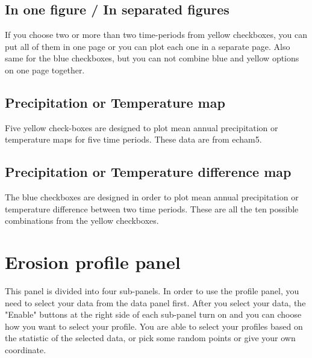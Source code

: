 \documentclass[11pt,a4paper,titlepage]{report}
\begin{document}
\subsection{In one figure / In separated figures}
If you choose two or more than two time-periods from yellow checkboxes, you can put all of them in one page or you can plot each one in a separate page. Also same for the blue checkboxes, but you can not combine blue and yellow options on one page together.

\subsection{Precipitation or Temperature map}
Five yellow check-boxes are designed to plot mean annual precipitation or temperature maps for five time periods. These data are from echam5.

\subsection{Precipitation or Temperature difference map}
The blue checkboxes are designed in order to plot mean annual precipitation or temperature difference between two time periods. These are all the ten possible combinations from the yellow checkboxes.

\section{Erosion profile panel}
This panel is divided into four sub-panels. In order to use the profile panel, you need to select your data from the data panel first. After you select your data, the "Enable" buttons at the right side of each sub-panel turn on and you can choose how you want to select your profile. You are able to select your profiles based on the statistic of the selected data, or pick some random points or give your own coordinate.
\end{document}
